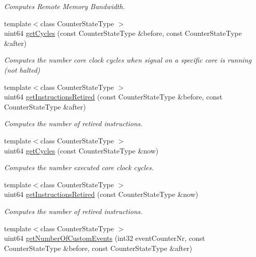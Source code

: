 \begin{DoxyCompactItemize}
\begin{DoxyCompactList}\small\item\em Computes Remote Memory Bandwidth. \end{DoxyCompactList}\item 
{\footnotesize template$<$class Counter\+State\+Type $>$ }\\uint64 \mbox{\hyperlink{class_basic_counter_state_a5a3275c4f489a475f1658f4546567af4}{get\+Cycles}} (const Counter\+State\+Type \&before, const Counter\+State\+Type \&after)
\begin{DoxyCompactList}\small\item\em Computes the number core clock cycles when signal on a specific core is running (not halted) \end{DoxyCompactList}\item 
{\footnotesize template$<$class Counter\+State\+Type $>$ }\\uint64 \mbox{\hyperlink{class_basic_counter_state_af124718a7620c7bbca81232c2149f771}{get\+Instructions\+Retired}} (const Counter\+State\+Type \&before, const Counter\+State\+Type \&after)
\begin{DoxyCompactList}\small\item\em Computes the number of retired instructions. \end{DoxyCompactList}\item 
{\footnotesize template$<$class Counter\+State\+Type $>$ }\\uint64 \mbox{\hyperlink{class_basic_counter_state_adc17d576ecaf02cf98cebc86329bf2a1}{get\+Cycles}} (const Counter\+State\+Type \&now)
\begin{DoxyCompactList}\small\item\em Computes the number executed core clock cycles. \end{DoxyCompactList}\item 
{\footnotesize template$<$class Counter\+State\+Type $>$ }\\uint64 \mbox{\hyperlink{class_basic_counter_state_afced47e4bb3712da79dc64cb16ac335a}{get\+Instructions\+Retired}} (const Counter\+State\+Type \&now)
\begin{DoxyCompactList}\small\item\em Computes the number of retired instructions. \end{DoxyCompactList}\item 
{\footnotesize template$<$class Counter\+State\+Type $>$ }\\uint64 \mbox{\hyperlink{class_basic_counter_state_abaa9d828b52f41866bf7dc8ff491a62e}{get\+Number\+Of\+Custom\+Events}} (int32 event\+Counter\+Nr, const Counter\+State\+Type \&before, const Counter\+State\+Type \&after)

\end{DoxyCompactItemize}
